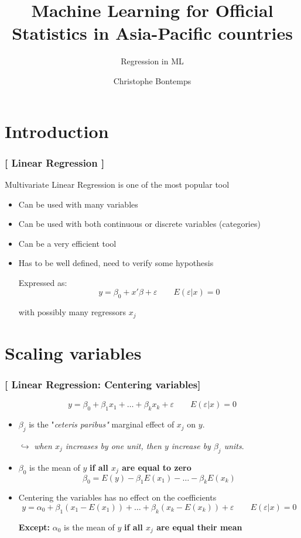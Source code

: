\documentclass[xcolor=x11names,compress]{beamer}
\title{\textcolor{siap}{Machine Learning for Official Statistics in Asia-Pacific countries \\ \vspace{0.5cm} }}
\subtitle{\textcolor{brique}{\Large{Regression in ML}}}
\author{\textcolor{siap}{Christophe Bontemps}}
\institute{ \texttt{[image: SIAP\_logo\_Big.png]}}
\date{}
\renewcommand{\(}{\begin{columns}}
\renewcommand{\)}{\end{columns}}
\newcommand{\<}[1]{\begin{column}{#1}}
\renewcommand{\>}{\end{column}}
\begin{document}
\begin{frame}
  \titlepage
\end{frame}


\section{Introduction}

\begin{frame} %

\frametitle{\textcolor{brique}{[ Linear Regression ]}}
Multivariate Linear Regression is one of the most popular tool
\pause
\begin{itemize}[<+->]
  \item Can be used with many variables
  \item Can be used with both continuous or discrete variables (categories)
  \item Can be a very efficient tool
  \item Has to be well defined, need to verify some hypothesis
  \item[] Expressed as: $$
  y  = \beta_0 + x'\beta + \varepsilon \qquad  E (\varepsilon|x)  = 0
  $$
  \item[] with possibly many regressors $x_j$
\end{itemize}
\end{frame}

\section{Scaling variables}

\begin{frame} %
\frametitle{\textcolor{brique}{[ Linear Regression: Centering variables]}}
$$
y  = \beta_0 + \beta_1 x_1 + \ldots + \beta_{k} x_k + \varepsilon \qquad E (\varepsilon|x)  = 0
$$
\pause
\begin{itemize}[<+->]
  \item $\beta_j$ is the "\textit{ceteris paribus"} marginal effect of $x_j$ on $y$.
  \item[$\hookrightarrow$]  \textit{when  $x_j$  increases by one unit, then $y$  increase by $\beta_j$ units}.
 \item $\beta_0$ is the mean of $y$ \textbf{if all $x_j$ are equal to zero}
  $$
    \beta_0  = E(y) - \beta_1 E(x_1) - \ldots - \beta_{k} E(x_k)  $$
  \item Centering the variables has no effect on the coefficients
     $$
   y = \alpha_0 + \beta_1 (x_1-E(x_1)) + \ldots + \beta_{k} (x_k-E(x_k))  + \varepsilon \qquad E (\varepsilon|x)  = 0
    $$
  \item[\textbf{Except:}] $ \alpha_0$  is the mean of $y$ \textbf{if all $x_j$ are equal their mean}
\end{itemize}
\end{frame}
\end{document}
